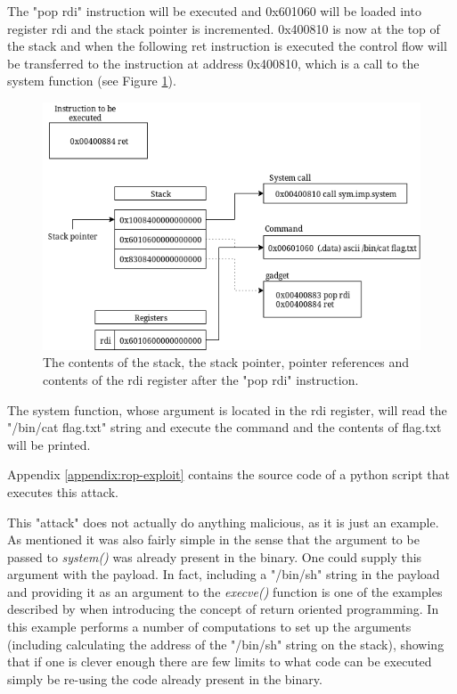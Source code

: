 \begin{enumerate}
The "pop rdi" instruction will be executed and 0x601060 will be loaded into register rdi
and the stack pointer is incremented. 0x400810 is now at the top of the stack and when the
following ret instruction is executed the control flow will be transferred to the
instruction at address 0x400810, which is a call to the system function (see Figure
\ref{fig:after-second}).

\begin{figure}[h]
	\centering
	\includegraphics[width=\textwidth]{background/software-diversity/figures/after-second}
	\caption{The contents of the stack, the stack pointer, pointer references and contents of the rdi register after the "pop rdi" instruction.}
	\label{fig:after-second}
\end{figure}

The system function, whose argument is located in the rdi register, will read the
"/bin/cat flag.txt" string and execute the command and the contents of flag.txt will be
printed.

Appendix \ref{appendix:rop-exploit} contains the source code of a python script that
executes this attack.

This "attack" does not actually do anything malicious, as it is just an example. As mentioned
it was also fairly simple in the sense that the argument to be passed to \textit{system()}
was already present in the binary. One could supply this argument with the payload. In
fact, including a "/bin/sh" string in the payload and providing it as an argument to the
\textit{execve()} function is one of the examples described by \textcite{rop} when
introducing the concept of return oriented programming. In this example \textcite{rop}
performs a number of computations to set up the arguments (including calculating the address
of the "/bin/sh" string on the stack), showing that if one is clever enough there are few
limits to what code can be executed simply be re-using the code already present in the binary.


\end{enumerate}
